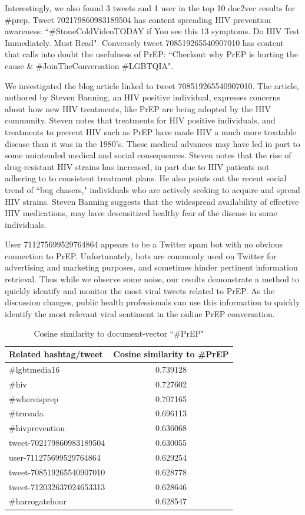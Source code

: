 \documentclass{sig-alternate-05-2015}
\begin{document}
Interestingly, we also found 3 tweets and 1 user in the top 10 doc2vec results for \#prep. Tweet 702179860983189504 has content spreading HIV prevention awareness: ``\#StoneColdVideoTODAY if You see this 13 symptoms. Do HIV Test Immediately. Must Read". Conversely tweet 708519265540907010 has content that calls into doubt the usefulness of PrEP: ``Checkout why PrEP is hurting the cause \& \#JoinTheConversation \#LGBTQIA".

We investigated the blog article linked to tweet 708519265540907010\cite{prephurtingcause}. The article, authored by Steven Banning, an HIV positive individual, expresses concerns about how new HIV treatments, like PrEP are being adopted by the HIV community. Steven notes that treatments for HIV positive individuals, and treatments to prevent HIV such as PrEP have made HIV a much more treatable disease than it was in the 1980's. These medical advances may have led in part to some unintended medical and social consequences. Steven notes that the rise of drug-resistant HIV strains has increased, in part due to HIV patients not adhering to to consistent treatment plans. He also points out the recent social trend of ``bug chasers," individuals who are actively seeking to acquire and spread HIV strains. Steven Banning suggests that the widespread availability of effective HIV medications, may have desensitized healthy fear of the disease in some individuals.

User 711275699529764864 appears to be a Twitter spam bot with no obvious connection to PrEP. Unfortunately, bots are commonly used on Twitter for advertising and marketing purposes, and sometimes hinder pertinent information retrieval. Thus while we observe some noise, our results demonstrate a method to quickly identify and monitor the most viral tweets related to PrEP. As the discussion changes, public health professionals can use this information to quickly identify the most relevant viral sentiment in the online PrEP conversation.

\begin{table}
\centering
\caption{Cosine similarity to document-vector ``\#PrEP"}
\begin{tabular}{|l|c|} \hline
Related hashtag/tweet & Cosine similarity to \#PrEP\\ \hline
\#lgbtmedia16 & 0.739128\\ \hline
\#hiv & 	0.727602 \\ \hline
\#whereisprep & 0.707165 \\ \hline
\#truvada & 0.696113 \\ \hline
\#hivprevention & 0.636068 \\ \hline
tweet-702179860983189504 & 0.630055\\ \hline
user-711275699529764864 & 0.629254\\ \hline
tweet-708519265540907010 & 0.628778 \\ \hline
tweet-712032637024653313 & 0.628646 \\ \hline
\#harrogatehour & 0.628547 \\ \hline
\hline\end{tabular}
\end{table}
\end{document}
